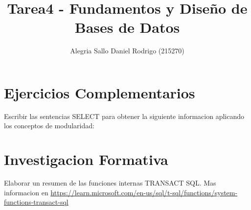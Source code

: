 \documentclass[a4paper,openany,11pt]{article}
\title{Tarea4 - Fundamentos y Diseño de Bases de Datos}
\author{Alegria Sallo Daniel Rodrigo (215270)}
\begin{document}
\maketitle

\section[5]{Ejercicios Complementarios}
Escribir las sentencias SELECT para obtener la siguiente informacion aplicando
los conceptos de modularidad:




\section[6]{Investigacion Formativa}
Elaborar un resumen de las funciones internas TRANSACT SQL.
Mas informacion en \url{https://learn.microsoft.com/en-us/sql/t-sql/functions/system-functions-transact-sql}
\end{document}
